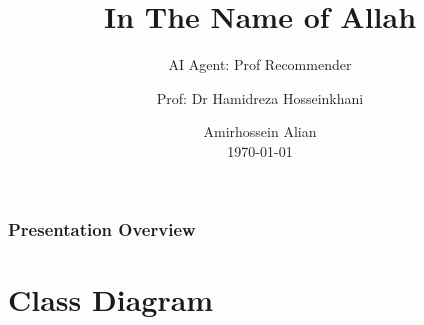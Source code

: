 \documentclass[
	11pt, %
]{beamer}
\title[AI Agent]{In The Name of Allah} %
\subtitle{AI Agent: Prof Recommender} %
\author[Amirhossein Alian]{Prof: Dr Hamidreza Hosseinkhani} %
\institute[]{Sharif University of Technology \\ \smallskip \textit{}} %
\date[\today]{Amirhossein Alian \\ \today} %
\begin{document}

\begin{frame}
	\titlepage %
\end{frame}



\begin{frame}
	\frametitle{Presentation Overview} %
	
	\tableofcontents %
\end{frame}


\section{Class Diagram} %
\end{document}
